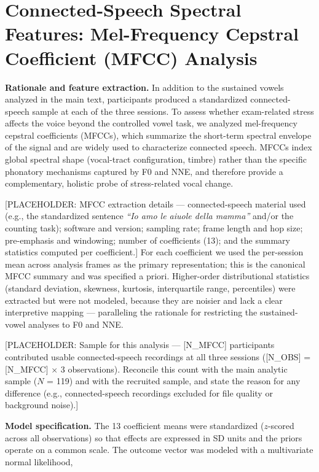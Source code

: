 \documentclass[
  english,
  man,floatsintext]{apa6}
\begin{document}
\newpage

\section{Connected-Speech Spectral Features: Mel-Frequency Cepstral Coefficient (MFCC) Analysis}\label{connected-speech-spectral-features-mel-frequency-cepstral-coefficient-mfcc-analysis}

\textbf{Rationale and feature extraction.} In addition to the sustained vowels analyzed in the main text, participants produced a standardized connected-speech sample at each of the three sessions. To assess whether exam-related stress affects the voice beyond the controlled vowel task, we analyzed mel-frequency cepstral coefficients (MFCCs), which summarize the short-term spectral envelope of the signal and are widely used to characterize connected speech. MFCCs index global spectral shape (vocal-tract configuration, timbre) rather than the specific phonatory mechanisms captured by F0 and NNE, and therefore provide a complementary, holistic probe of stress-related vocal change.

{[}PLACEHOLDER: MFCC extraction details --- connected-speech material used (e.g., the standardized sentence \emph{``Io amo le aiuole della mamma''} and/or the counting task); software and version; sampling rate; frame length and hop size; pre-emphasis and windowing; number of coefficients (13); and the summary statistics computed per coefficient.{]} For each coefficient we used the per-session mean across analysis frames as the primary representation; this is the canonical MFCC summary and was specified a priori. Higher-order distributional statistics (standard deviation, skewness, kurtosis, interquartile range, percentiles) were extracted but were not modeled, because they are noisier and lack a clear interpretive mapping --- paralleling the rationale for restricting the sustained-vowel analyses to F0 and NNE.

{[}PLACEHOLDER: Sample for this analysis --- {[}N\_MFCC{]} participants contributed usable connected-speech recordings at all three sessions ({[}N\_OBS{]} = {[}N\_MFCC{]} \(\times\) 3 observations). Reconcile this count with the main analytic sample (\(N\) = 119) and with the recruited sample, and state the reason for any difference (e.g., connected-speech recordings excluded for file quality or background noise).{]}

\textbf{Model specification.} The 13 coefficient means were standardized (\(z\)-scored across all observations) so that effects are expressed in SD units and the priors operate on a common scale. The outcome vector was modeled with a multivariate normal likelihood,
\end{document}
